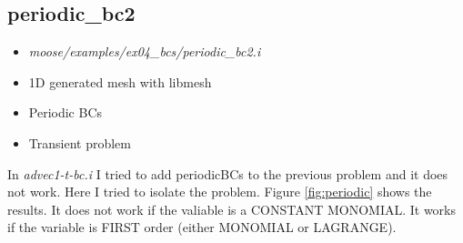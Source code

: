 \documentclass[11pt,letterpaper]{article}
\begin{document}
    \subsection{periodic\_bc2}

	\begin{itemize}
		\item \textit{moose/examples/ex04\_bcs/periodic\_bc2.i}
		\item 1D generated mesh with libmesh
		\item Periodic BCs
		\item Transient problem
	\end{itemize}

    In \textit{advec1-t-bc.i} I tried to add periodicBCs to the previous problem and it does not work.
    Here I tried to isolate the problem.
    Figure \ref{fig:periodic} shows the results.
    It does not work if the valiable is a CONSTANT MONOMIAL.
    It works if the variable is FIRST order (either MONOMIAL or LAGRANGE).
\end{document}
